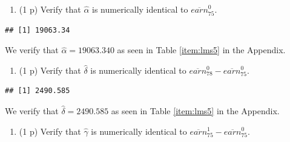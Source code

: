 \documentclass[
]{article}
\newenvironment{Shaded}{\begin{snugshade}}{\end{snugshade}}
\newcommand{\FunctionTok}[1]{\textcolor[rgb]{0.00,0.00,0.00}{#1}}
\newcommand{\NormalTok}[1]{#1}
\newcommand{\SpecialCharTok}[1]{\textcolor[rgb]{0.00,0.00,0.00}{#1}}
\providecommand{\tightlist}{%
  \setlength{\itemsep}{0pt}\setlength{\parskip}{0pt}}
\begin{document}
\begin{enumerate}
\def\labelenumi{\alph{enumi}.}
\setcounter{enumi}{1}
\tightlist
\item
  (1 p) Verify that \(\hat{\alpha}\) is numerically identical to
  \(\overline{earn}_{75}^{0}\).
\end{enumerate}

\begin{Shaded}
\end{Shaded}

\begin{verbatim}
## [1] 19063.34
\end{verbatim}

We verify that \(\hat{\alpha} = 19063.340\) as seen in Table
\ref{item:lms5} in the Appendix.

\begin{enumerate}
\def\labelenumi{\alph{enumi}.}
\setcounter{enumi}{2}
\tightlist
\item
  (1 p) Verify that \(\hat{\delta}\) is numerically identical to
  \(\overline{earn}_{78}^{0}-\overline{earn}_{75}^{0}\).
\end{enumerate}

\begin{Shaded}
\end{Shaded}

\begin{verbatim}
## [1] 2490.585
\end{verbatim}

We verify that \(\hat{\delta} = 2490.585\) as seen in Table
\ref{item:lms5} in the Appendix.

\begin{enumerate}
\def\labelenumi{\alph{enumi}.}
\setcounter{enumi}{3}
\tightlist
\item
  (1 p) Verify that \(\hat{\gamma}\) is numerically identical to
  \(\overline{earn}_{75}^{1}-\overline{earn}_{75}^{0}\).
\end{enumerate}
\end{document}
